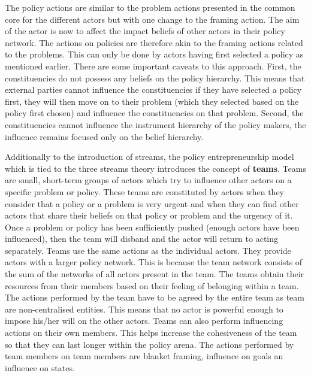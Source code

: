 The policy actions are similar to the problem actions presented in the common core for the different actors but with one change to the framing action. The aim of the actor is now to affect the impact beliefs of other actors in their policy network. The actions on policies are therefore akin to the framing actions related to the problems. This can only be done by actors having first selected a policy as mentioned earlier. There are some important caveats to this approach. First, the constituencies do not possess any beliefs on the policy hierarchy. This means that external parties cannot influence the constituencies if they have selected a policy first, they will then move on to their problem (which they selected based on the policy first chosen) and influence the constituencies on that problem. Second, the constituencies cannot influence the instrument hierarchy of the policy makers, the influence remains focused only on the belief hierarchy.

Additionally to the introduction of streams, the policy entrepreneurship model which is tied to the three streams theory introduces the concept of {\bfseries teams}. Teams are small, short-term groups of actors which try to influence other actors on a specific problem or policy. These teams are constituted by actors when they consider that a policy or a problem is very urgent and when they can find other actors that share their beliefs on that policy or problem and the urgency of it. Once a problem or policy has been sufficiently pushed (enough actors have been influenced), then the team will disband and the actor will return to acting separately. Teams use the same actions as the individual actors. They provide actors with a larger policy network. This is because the team network consists of the sum of the networks of all actors present in the team. The teams obtain their resources from their members based on their feeling of belonging within a team. The actions performed by the team have to be agreed by the entire team as team are non-centralised entities. This means that no actor is powerful enough to impose his/her will on the other actors. Teams can also perform influencing actions on their own members. This helps increase the cohesiveness of the team so that they can last longer within the policy arena. The actions performed by team members on team members are blanket framing, influence on goals an influence on states.

